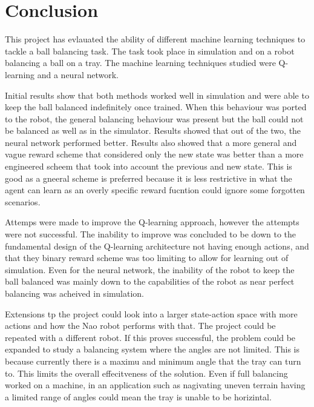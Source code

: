 \documentclass[12pt,a4paper]{article}
\begin{document}
\section{Conclusion}

This project has evlauated the ability of different machine learning techniques to tackle a ball balancing task. The task took place in simulation and on a robot balancing a ball on a tray. The machine learning techniques studied were Q-learning and a neural network. 

Initial results show that both methods worked well in simulation and were able to keep the ball balanced indefinitely once trained. When this behaviour was ported to the robot, the general balancing behaviour was present but the ball could not be balanced as well as in the simulator. Results showed that out of the two, the neural network performed better. Results also showed that a more general and vague reward scheme that considered only the new state was better than a more engineered scheem that took into account the previous and new state. This is good as a gneeral scheme is preferred because it is less restrictive in what the agent can learn as an overly specific reward fucntion could ignore some forgotten scenarios.

Attemps were made to improve the Q-learning approach, however the attempts were not successful. The inability to improve was concluded to be down to the fundamental design of the Q-learning architecture not having enough actions, and that they binary reward scheme was too limiting to allow for learning out of simulation. Even for the neural network, the inability of the robot to keep the ball balanced was mainly down to the capabilities of the robot as near perfect balancing was acheived in simulation. 

Extensions tp the project could look into a larger state-action space with more actions and how the Nao robot performs with that. The project could be repeated with a different robot. If this proves successful, the problem could be expanded to study a balancing system where the angles are not limited. This is because currently there is a maximu and minimum angle that the tray can turn to. This limits the overall effecitveness of the solution. Even if full balancing worked on a machine, in an application such as nagivating uneven terrain having a limited range of angles could mean the tray is unable to be horizintal. 


\end{document}
